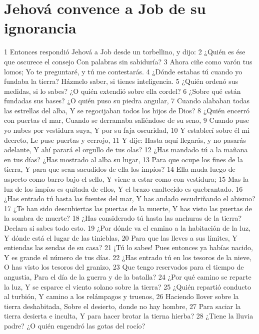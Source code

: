 \section*{Jehová convence a Job de su ignorancia}  

1 Entonces respondió Jehová a Job desde un torbellino, y dijo:  
2 ¿Quién es ése que oscurece el consejo  
Con palabras sin sabiduría?  
3 Ahora ciñe como varón tus lomos;  
Yo te preguntaré, y tú me contestarás.  
4 ¿Dónde estabas tú cuando yo fundaba la tierra?  
Házmelo saber, si tienes inteligencia.  
5 ¿Quién ordenó sus medidas, si lo sabes?  
¿O quién extendió sobre ella cordel?  
6 ¿Sobre qué están fundadas sus bases?  
¿O quién puso su piedra angular,  
7 Cuando alababan todas las estrellas del alba,  
Y se regocijaban todos los hijos de Dios?  
8 ¿Quién encerró con puertas el mar,  
Cuando se derramaba saliéndose de su seno, 
9 Cuando puse yo nubes por vestidura suya,  
Y por su faja oscuridad,  
10 Y establecí sobre él mi decreto,  
Le puse puertas y cerrojo,  
11 Y dije: Hasta aquí llegarás, y no pasarás adelante,  
Y ahí parará el orgullo de tus olas? 
12 ¿Has mandado tú a la mañana en tus días?  
¿Has mostrado al alba su lugar,  
13 Para que ocupe los fines de la tierra,  
Y para que sean sacudidos de ella los impíos?  
14 Ella muda luego de aspecto como barro bajo el sello,  
Y viene a estar como con vestidura;  
15 Mas la luz de los impíos es quitada de ellos,  
Y el brazo enaltecido es quebrantado.  
16 ¿Has entrado tú hasta las fuentes del mar,  
Y has andado escudriñando el abismo?  
17 ¿Te han sido descubiertas las puertas de la muerte,  
Y has visto las puertas de la sombra de muerte?  
18 ¿Has considerado tú hasta las anchuras de la tierra?  
Declara si sabes todo esto.  
19 ¿Por dónde va el camino a la habitación de la luz,  
Y dónde está el lugar de las tinieblas,  
20 Para que las lleves a sus límites,  
Y entiendas las sendas de su casa?  
21 ¡Tú lo sabes! Pues entonces ya habías nacido,  
Y es grande el número de tus días.  
22 ¿Has entrado tú en los tesoros de la nieve,  
O has visto los tesoros del granizo,  
23 Que tengo reservados para el tiempo de angustia,  
Para el día de la guerra y de la batalla?  
24 ¿Por qué camino se reparte la luz,  
Y se esparce el viento solano sobre la tierra? 
25 ¿Quién repartió conducto al turbión,  
Y camino a los relámpagos y truenos,  
26 Haciendo llover sobre la tierra deshabitada, 
Sobre el desierto, donde no hay hombre,  
27 Para saciar la tierra desierta e inculta,  
Y para hacer brotar la tierna hierba?  
28 ¿Tiene la lluvia padre?  
¿O quién engendró las gotas del rocío?  
